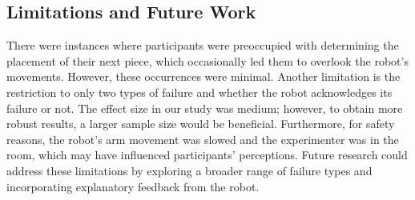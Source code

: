 \subsection{Limitations and Future Work}
 There were instances where participants were preoccupied with determining the placement of their next piece, which occasionally led them to overlook the robot's movements. However, these occurrences were minimal. Another limitation is the restriction to only two types of failure and whether the robot acknowledges its failure or not. The effect size in our study was medium; however, to obtain more robust results, a larger sample size would be beneficial.
 Furthermore, for safety reasons, the robot's arm movement was slowed and the experimenter was in the room, which may have influenced participants' perceptions. 
 Future research could address these limitations by exploring a broader range of failure types and incorporating explanatory feedback from the robot.




